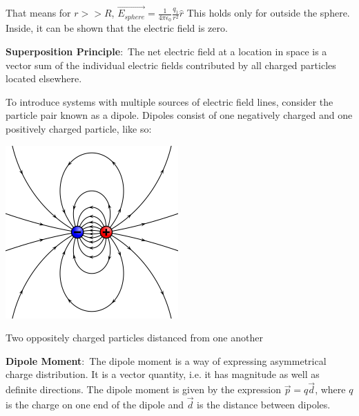 \documentclass[nobib]{tufte-handout}
\newcommand{\defn}[2]{\noindent\textbf{#1}:\ #2}
\begin{document}
That means for $r>>R$, $\vec{E_{sphere}} = \frac{1}{4\pi \epsilon_0}\frac{q_1}{r^2}\hat{r}$
This holds only for outside the sphere. Inside, it can be shown that the electric field is zero. 

\defn{Superposition Principle}{The net electric field at a location in space is a
vector sum of the individual electric fields contributed by all
charged particles located elsewhere.}

To introduce systems with multiple sources of electric field lines, consider
the particle pair known as a dipole. Dipoles consist of one negatively charged
and one positively charged particle, like so:
\begin{marginfigure}
    \centering
    \includegraphics[width=\textwidth / 2]{images/VFPt_dipole_electric.svg.png}
    \caption{Two oppositely charged particles distanced from one another}
    \label{fig:dipole}
\end{marginfigure}

\defn{Dipole Moment}{The dipole moment is a way of expressing asymmetrical charge distribution.
It is a vector quantity, i.e. it has magnitude as well as definite directions.} The
dipole moment is given by the expression $\vec{p} = q\vec{d}$, where $q$ is
the charge on one end of the dipole and $\vec{d}$ is the distance between dipoles.
\end{document}
